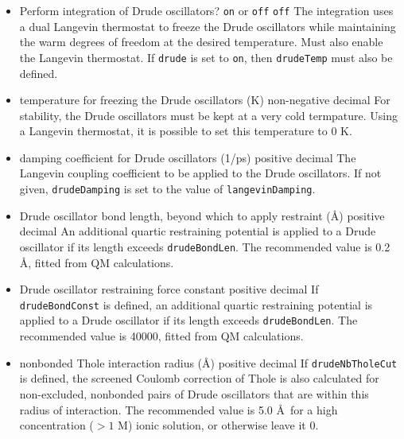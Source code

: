 \begin{itemize}

\item{}
{Perform integration of Drude oscillators?}
{{\tt on} or {\tt off}}
{{\tt off}}
{The integration uses a dual Langevin thermostat to freeze the Drude 
oscillators while maintaining the warm degrees of freedom at the
desired temperature.  Must also enable the Langevin thermostat.
If {\tt drude} is set to {\tt on}, then {\tt drudeTemp} must also be defined.}

\item{}
{temperature for freezing the Drude oscillators (K)}
{non-negative decimal}
{For stability, the Drude oscillators must be kept at a very cold termpature.
Using a Langevin thermostat, it is possible to set this temperature to 0 K.}

\item{}
{damping coefficient for Drude oscillators (1/ps)}
{positive decimal}
{The Langevin coupling coefficient to be applied to the Drude oscillators.  
If not given, {\tt drudeDamping} is set to the value of {\tt langevinDamping}.}

\item{}
{Drude oscillator bond length, beyond which to apply restraint (\AA)}
{positive decimal}
{An additional quartic restraining potential is applied to a Drude 
oscillator if its length exceeds {\tt drudeBondLen}.  
The recommended value is 0.2 \AA, fitted from QM calculations.}

\item{}
{Drude oscillator restraining force constant}
{positive decimal}
{If {\tt drudeBondConst} is defined,
an additional quartic restraining potential is applied to a Drude 
oscillator if its length exceeds {\tt drudeBondLen}.
The recommended value is 40000, fitted from QM calculations.}

\item{}
{nonbonded Thole interaction radius (\AA)}
{positive decimal}
{If {\tt drudeNbTholeCut} is defined, 
the screened Coulomb correction of Thole is also calculated
for non-excluded, nonbonded pairs of Drude oscillators that are
within this radius of interaction.
The recommended value is 5.0 \AA\ for a high concentration ($> 1$ M) 
ionic solution, or otherwise leave it 0.}

\end{itemize}


